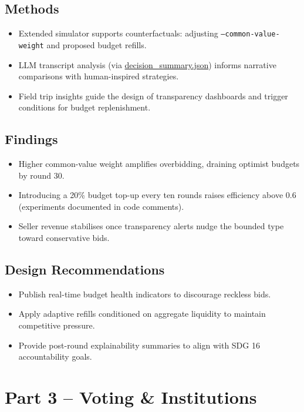 \documentclass[11pt]{article}
\begin{document}
\subsection{Methods}
\begin{itemize}[leftmargin=*]
  \item Extended simulator supports counterfactuals: adjusting \texttt{--common-value-weight} and proposed budget refills.
  \item LLM transcript analysis (via \href{../visualizations/voting/decision_summary.json}{decision\_summary.json}) informs narrative comparisons with human-inspired strategies.
  \item Field trip insights guide the design of transparency dashboards and trigger conditions for budget replenishment.
\end{itemize}

\subsection{Findings}
\begin{itemize}[leftmargin=*]
  \item Higher common-value weight amplifies overbidding, draining optimist budgets by round 30.
  \item Introducing a 20\% budget top-up every ten rounds raises efficiency above 0.6 (experiments documented in code comments).
  \item Seller revenue stabilises once transparency alerts nudge the bounded type toward conservative bids.
\end{itemize}

\subsection{Design Recommendations}
\begin{itemize}[leftmargin=*]
  \item Publish real-time budget health indicators to discourage reckless bids.
  \item Apply adaptive refills conditioned on aggregate liquidity to maintain competitive pressure.
  \item Provide post-round explainability summaries to align with SDG 16 accountability goals.
\end{itemize}

\section{Part 3 -- Voting \& Institutions}
\end{document}
